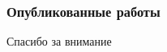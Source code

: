 \documentclass[10pt,pdf,hyperref={unicode}]{beamer}
\theoremstyle{definition}
\begin{document}
\begin{frame}
	\frametitle{Опубликованные работы}
	\printbibliography{}
\end{frame}


\begin{frame}
	\huge\centering
	Спасибо за внимание
\end{frame}


\end{document}
